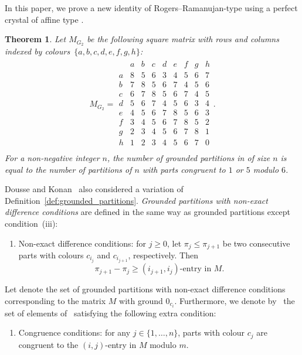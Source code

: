 \documentclass[pdftex]{sigma}
\numberwithin{equation}{section}
\newtheorem{Theorem}{Theorem}[section]
\theoremstyle{definition}
\begin{document}
In this paper, we prove a new identity of Rogers--Ramanujan-type using a perfect crystal of affine type .

\begin{Theorem}\label{thm:G2identity}
Let $M_{G_2}$ be the following square matrix with rows and columns indexed by colours~$\{a,b,c,d,e,f,g,h\}$:
\begin{align*}
M_{G_2} = \begin{array}{c|cccccccc}
& a & b & c & d & e & f & g & h \\
\hline
a &8&5&6&3&4&5&6&7\\
b &7&8&5&6&7&4&5&6\\
c &6&7&8&5&6&7&4&5\\
d &5&6&7&4&5&6&3&4\\
e &4&5&6&7&8&5&6&3\\
f &3&4&5&6&7&8&5&2\\
g &2&3&4&5&6&7&8&1\\
h &1&2&3&4&5&6&7&0\\
\end{array}.
\end{align*}
For a non-negative integer $n$, the number of grounded partitions in  of size $n$ is equal to the number of partitions of $n$ with parts congruent to $1$ or $5$ modulo $6$.
\end{Theorem}

Dousse and Konan~\cite{DK19b} also considered a variation of Definition~\ref{def:grounded_partitions}. \emph{Grounded partitions with non-exact difference conditions} are defined in the same way as grounded partitions except condition~(iii):
\begin{enumerate}\itemsep=0pt
\item[(iii$'$)] Non-exact difference conditions: for $ j \geq 0 $, let
 $\pi_{j}\leq\pi_{j+1}$ be two consecutive parts with
 colours $c_{i_j}$ and $c_{i_{j+1}}$, respectively. Then
 \[
 \pi_{j+1}-\pi_{j} \geq (i_{j+1},i_j)\text{-entry in } M.
 \]
\end{enumerate}
Let  denote the set of grounded partitions with non-exact difference conditions corresponding to the matrix $M$ with ground $0_{c_i}$. Furthermore, we denote by~ the set of elements of~ satisfying the following extra condition:
\begin{enumerate}\itemsep=0pt
\item[(iv)] Congruence conditions: for any $j\in\{1,\ldots,n\}$, parts with colour $c_j$ are congruent to the $ (i,j)$-entry in $M$ modulo $m$.
\end{enumerate}
\end{document}
